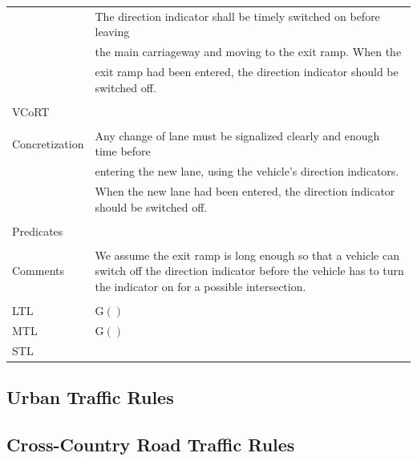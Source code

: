 \begin{table}[H]
\begin{tabular}[t]{ll}
		& The direction indicator shall be timely switched on before leaving \\
		& the main carriageway and moving to the exit ramp. When the \\
		& exit ramp had been entered, the direction indicator should be switched off. \\
		&\\
		VCoRT  &  \\
		&\\
		Concretization &  Any change of lane must be signalized clearly and enough time before \\
		& entering the new lane, using the vehicle’s direction indicators.\\
		& When the new lane had been entered, the direction indicator should be switched off.\\
		&\\
		Predicates & \\
		&\\
		Comments & We assume the exit ramp is long enough so that a vehicle can switch off the direction indicator before the vehicle has to turn the indicator on for a possible intersection.  \\
		&\\
		LTL & G$()$ \\
		MTL & G$()$\\
		STL & \\
		\bottomrule
	\end{tabular}
\end{table}

\subsection{Urban Traffic Rules}
\label{sec:urban_rules}

\subsection{Cross-Country Road Traffic Rules}
\label{sec:cross_country_rules}